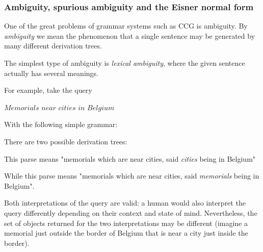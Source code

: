 \documentclass[main.tex]{subfiles}
\begin{document}
\subsubsection{Ambiguity, spurious ambiguity and the Eisner normal form}
One of the great problems of grammar systems such as CCG is ambiguity.
By \emph{ambiguity} we mean the phenomenon that a single sentence may be
generated by many different derivation trees.

The simplest type of ambiguity is \emph{lexical ambiguity}, where the given
sentence actually has several meanings.

\begin{example}
    For example, take the query
    \begin{center}
        $Memorials$ $near$ $cities$ $in$ $Belgium$
    \end{center}
    With the following simple grammar:


    There are two possible derivation trees:


    This parse means "memorials which are near cities, said \emph{cities} being
    in Belgium"


    While this parse means "memorials which are near cities, said \emph{memorials}
    being in Belgium".

    Both interpretations of the query are valid: a human would also interpret
    the query differently depending on their context and state of mind.
    Nevertheless, the set of objects returned for the two interpretations may
    be different (imagine a memorial just outside the border of Belgium
    that is near a city just inside the border).
\end{example}
\end{document}

